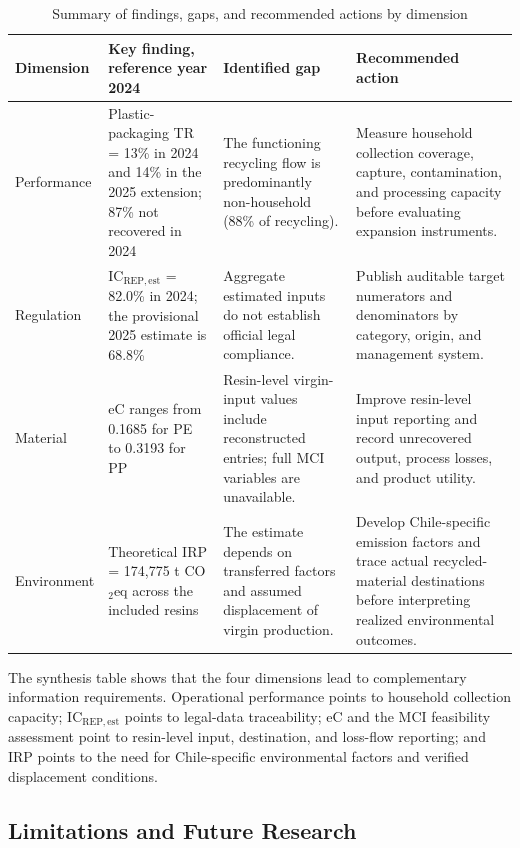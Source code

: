 \documentclass[review,10pt]{elsarticle}
\newcommand{\revpar}[1]{#1\par\medskip}
\begin{document}
\begin{longtable}{|L{3cm}|L{4cm}|L{4cm}|L{4cm}|}
\caption{Summary of findings, gaps, and recommended actions by dimension}
\label{tab:sintesis}\\
\hline
\textbf{Dimension} & \textbf{Key finding, reference year 2024} & \textbf{Identified gap} & \textbf{Recommended action} \\
\hline
\endfirsthead
\hline
Performance & Plastic-packaging TR = 13\% in 2024 and 14\% in the 2025 extension; 87\% not recovered in 2024 & The functioning recycling flow is predominantly non-household (88\% of recycling). & Measure household collection coverage, capture, contamination, and processing capacity before evaluating expansion instruments. \\
\hline
Regulation & IC$_{\mathrm{REP,est}}$ = 82.0\% in 2024; the provisional 2025 estimate is 68.8\% & Aggregate estimated inputs do not establish official legal compliance. & Publish auditable target numerators and denominators by category, origin, and management system. \\
\hline
Material & eC ranges from 0.1685 for PE to 0.3193 for PP & Resin-level virgin-input values include reconstructed entries; full MCI variables are unavailable. & Improve resin-level input reporting and record unrecovered output, process losses, and product utility. \\
\hline
Environment & Theoretical IRP = 174,775 t CO$_2$eq across the included resins & The estimate depends on transferred factors and assumed displacement of virgin production. & Develop Chile-specific emission factors and trace actual recycled-material destinations before interpreting realized environmental outcomes. \\
\hline
\end{longtable}

\revpar{The synthesis table shows that the four dimensions lead to complementary information requirements. Operational performance points to household collection capacity; IC$_{\mathrm{REP,est}}$ points to legal-data traceability; eC and the MCI feasibility assessment point to resin-level input, destination, and loss-flow reporting; and IRP points to the need for Chile-specific environmental factors and verified displacement conditions.}

\subsection{Limitations and Future Research}
\end{document}
